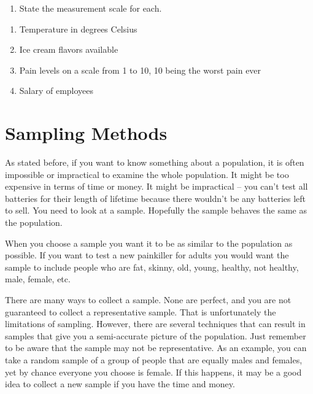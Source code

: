 \documentclass[]{book}
\providecommand{\tightlist}{%
  \setlength{\itemsep}{0pt}\setlength{\parskip}{0pt}}
\begin{document}
\begin{enumerate}
\def\labelenumi{\arabic{enumi}.}
\setcounter{enumi}{9}
\tightlist
\item
  State the measurement scale for each.
\end{enumerate}

\begin{enumerate}
\def\labelenumi{\alph{enumi}.}
\item
  Temperature in degrees Celsius
\item
  Ice cream flavors available
\item
  Pain levels on a scale from 1 to 10, 10 being the worst pain ever
\item
  Salary of employees
\end{enumerate}

\hypertarget{sampling-methods}{%
\section{Sampling Methods}\label{sampling-methods}}

As stated before, if you want to know something about a population, it is often impossible or impractical to examine the whole population. It might be too expensive in terms of time or money. It might be impractical -- you can't test all batteries for their length of lifetime because there wouldn't be any batteries left to sell. You need to look at a sample. Hopefully the sample behaves the same as the population.

When you choose a sample you want it to be as similar to the population as possible. If you want to test a new painkiller for adults you would want the sample to include people who are fat, skinny, old, young, healthy, not healthy, male, female, etc.

There are many ways to collect a sample. None are perfect, and you are not guaranteed to collect a representative sample. That is unfortunately the limitations of sampling. However, there are several techniques that can result in samples that give you a semi-accurate picture of the population. Just remember to be aware that the sample may not be representative. As an example, you can take a random sample of a group of people that are equally males and females, yet by chance everyone you choose is female. If this happens, it may be a good idea to collect a new sample if you have the time and money.
\end{document}
